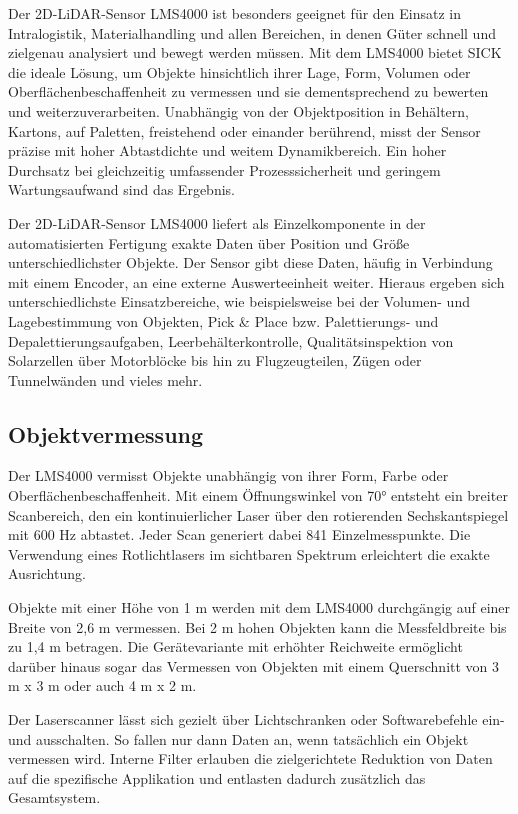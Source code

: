 Der 2D-LiDAR-Sensor LMS4000 ist besonders geeignet für den Einsatz in Intralogistik, Materialhandling und allen Bereichen, in denen Güter schnell und zielgenau analysiert und bewegt werden müssen. Mit dem LMS4000 bietet SICK die ideale Lösung, um Objekte hinsichtlich ihrer Lage, Form, Volumen oder Oberflächenbeschaffenheit zu vermessen und sie dementsprechend zu bewerten und weiterzuverarbeiten. Unabhängig von der Objektposition in Behältern, Kartons, auf Paletten, freistehend oder einander berührend, misst der Sensor präzise mit hoher Abtastdichte und weitem Dynamikbereich. Ein hoher Durchsatz bei gleichzeitig umfassender Prozesssicherheit und geringem Wartungsaufwand sind das Ergebnis.

Der 2D-LiDAR-Sensor LMS4000 liefert als Einzelkomponente in der automatisierten Fertigung exakte Daten über Position und Größe unterschiedlichster Objekte. Der Sensor gibt diese Daten, häufig in Verbindung mit einem Encoder, an eine externe Auswerteeinheit weiter. Hieraus ergeben sich unterschiedlichste Einsatzbereiche, wie beispielsweise bei der Volumen- und Lagebestimmung von Objekten, Pick & Place bzw. Palettierungs- und Depalettierungsaufgaben, Leerbehälterkontrolle, Qualitätsinspektion von Solarzellen über Motorblöcke bis hin zu Flugzeugteilen, Zügen oder Tunnelwänden und vieles mehr.

\subsection{Objektvermessung}

Der LMS4000 vermisst Objekte unabhängig von ihrer Form, Farbe oder Oberflächenbeschaffenheit. Mit einem Öffnungswinkel von 70° entsteht ein breiter Scanbereich, den ein kontinuierlicher Laser über den rotierenden Sechskantspiegel mit 600 Hz abtastet. Jeder Scan generiert dabei 841 Einzelmesspunkte. Die Verwendung eines Rotlichtlasers im sichtbaren Spektrum erleichtert die exakte Ausrichtung.

Objekte mit einer Höhe von 1 m werden mit dem LMS4000 durchgängig auf einer Breite von 2,6 m vermessen. Bei 2 m hohen Objekten kann die Messfeldbreite bis zu 1,4 m betragen. Die Gerätevariante mit erhöhter Reichweite ermöglicht darüber hinaus sogar das Vermessen von Objekten mit einem Querschnitt von 3 m x 3 m oder auch 4 m x 2 m.

Der Laserscanner lässt sich gezielt über Lichtschranken oder Softwarebefehle ein- und ausschalten. So fallen nur dann Daten an, wenn tatsächlich ein Objekt vermessen wird. Interne Filter erlauben die zielgerichtete Reduktion von Daten auf die spezifische Applikation und entlasten dadurch zusätzlich das Gesamtsystem.

